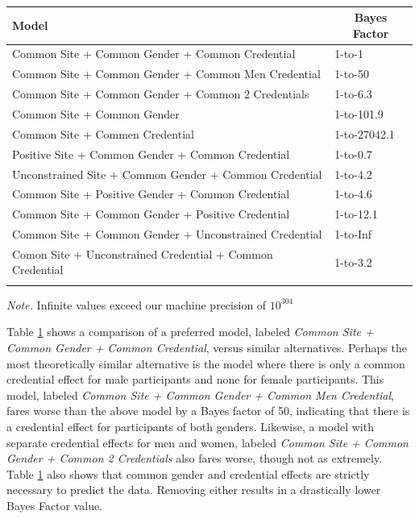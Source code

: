 \documentclass[english,man]{apa6}
\theoremstyle{definition}
\theoremstyle{definition}
\theoremstyle{remark}
\begin{document}
\begin{table}[tbp]
\begin{center}
\begin{threeparttable}
\caption{\label{tab:ml3BF}}
\begin{tabular}{ll}
\toprule
Model & \multicolumn{1}{c}{Bayes Factor}\\
\midrule
Common Site + Common Gender + Common Credential & 1-to-1\\
Common Site + Common Gender + Common Men Credential & 1-to-50\\
Common Site + Common Gender + Common 2 Credentials & 1-to-6.3\\
Common Site + Common Gender & 1-to-101.9\\
Common Site + Commen Credential & 1-to-27042.1\\
Positive Site + Common Gender + Common Credential & 1-to-0.7\\
Unconstrained Site + Common Gender + Common Credential & 1-to-4.2\\
Common Site + Positive Gender + Common Credential & 1-to-4.6\\
Common Site + Common Gender + Positive Credential & 1-to-12.1\\
Common Site + Common Gender + Unconstrained Credential & 1-to-Inf\\
Comon Site + Unconstrained Credential + Common Credential & 1-to-3.2\\
\bottomrule
\addlinespace
\end{tabular}
\begin{tablenotes}[para]
\textit{Note.} Infinite values exceed our machine precision of $10^304$
\end{tablenotes}
\end{threeparttable}
\end{center}
\end{table}

Table \ref{tab:ml3BF} shows a comparison of a preferred model, labeled
\emph{Common Site + Common Gender + Common Credential}, versus similar
alternatives. Perhaps the most theoretically similar alternative is the
model where there is only a common credential effect for male
participants and none for female participants. This model, labeled
\emph{Common Site + Common Gender + Common Men Credential}, fares worse
than the above model by a Bayes factor of 50, indicating that there is a
credential effect for participants of both genders. Likewise, a model
with separate credential effects for men and women, labeled \emph{Common
Site + Common Gender + Common 2 Credentials} also fares worse, though
not as extremely. Table \ref{tab:ml3BF} also shows that common gender
and credential effects are strictly necessary to predict the data.
Removing either results in a drastically lower Bayes Factor value.
\end{document}
